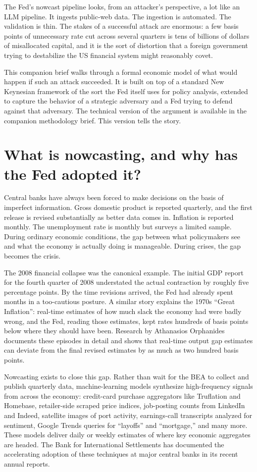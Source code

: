 \documentclass[12pt]{article}
\begin{document}
The Fed's nowcast pipeline looks, from an attacker's perspective, a lot like an LLM pipeline. It ingests public-web data. The ingestion is automated. The validation is thin. The stakes of a successful attack are enormous: a few basis points of unnecessary rate cut across several quarters is tens of billions of dollars of misallocated capital, and it is the sort of distortion that a foreign government trying to destabilize the US financial system might reasonably covet.

This companion brief walks through a formal economic model of what would happen if such an attack succeeded. It is built on top of a standard New Keynesian framework of the sort the Fed itself uses for policy analysis, extended to capture the behavior of a strategic adversary and a Fed trying to defend against that adversary. The technical version of the argument is available in the companion methodology brief. This version tells the story.

\section{What is nowcasting, and why has the Fed adopted it?}

Central banks have always been forced to make decisions on the basis of imperfect information. Gross domestic product is reported quarterly, and the first release is revised substantially as better data comes in. Inflation is reported monthly. The unemployment rate is monthly but surveys a limited sample. During ordinary economic conditions, the gap between what policymakers see and what the economy is actually doing is manageable. During crises, the gap becomes the crisis.

The 2008 financial collapse was the canonical example. The initial GDP report for the fourth quarter of 2008 understated the actual contraction by roughly five percentage points. By the time revisions arrived, the Fed had already spent months in a too-cautious posture. A similar story explains the 1970s ``Great Inflation'': real-time estimates of how much slack the economy had were badly wrong, and the Fed, reading those estimates, kept rates hundreds of basis points below where they should have been. Research by Athanasios Orphanides documents these episodes in detail and shows that real-time output gap estimates can deviate from the final revised estimates by as much as two hundred basis points.

Nowcasting exists to close this gap. Rather than wait for the BEA to collect and publish quarterly data, machine-learning models synthesize high-frequency signals from across the economy: credit-card purchase aggregators like Truflation and Homebase, retailer-side scraped price indices, job-posting counts from LinkedIn and Indeed, satellite images of port activity, earnings-call transcripts analyzed for sentiment, Google Trends queries for ``layoffs'' and ``mortgage,'' and many more. These models deliver daily or weekly estimates of where key economic aggregates are headed. The Bank for International Settlements has documented the accelerating adoption of these techniques at major central banks in its recent annual reports.
\end{document}
